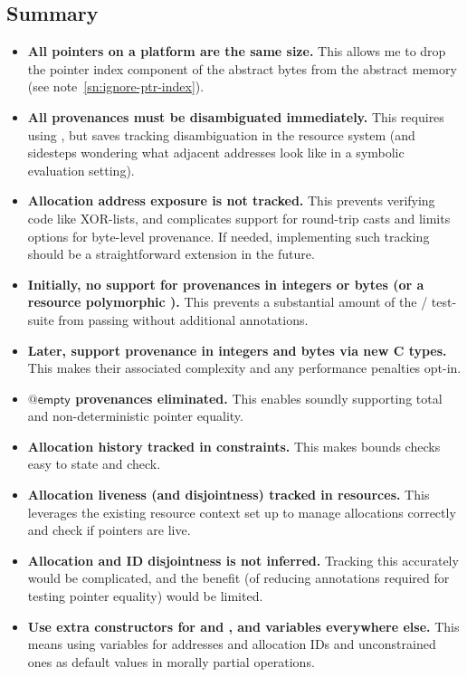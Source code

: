 \subsection{Summary}

\begin{itemize}
    \item \textbf{All pointers on a platform are the same size.} This
        allows me to drop the pointer index component of the abstract bytes
        from the abstract memory (see note~\ref{sn:ignore-ptr-index}).
    \item \textbf{All provenances must be disambiguated immediately.} This
        requires using , but saves tracking
        disambiguation in the resource system (and sidesteps wondering what
        adjacent addresses look like in a symbolic evaluation setting).
    \item \textbf{Allocation address exposure is not tracked.} This prevents
        verifying code like XOR-lists, and complicates support for round-trip
        casts and limits options for byte-level provenance. If needed,
        implementing such tracking should be a straightforward extension in the
        future.
    \item \textbf{Initially, no support for provenances in integers or bytes
        (or a resource polymorphic ).}
        This prevents a substantial amount of the /
        test-suite from passing without additional annotations.
    \item \textbf{Later, support provenance in integers and bytes via new C
        types.} This makes their associated complexity and any performance
        penalties opt-in.
    \item \textbf{$@\mathsf{empty}$ provenances eliminated.} This enables
        soundly supporting total and non-deterministic pointer equality.
    \item \textbf{Allocation history tracked in constraints.} This makes
        bounds checks easy to state and check.
    \item \textbf{Allocation liveness (and disjointness) tracked in
        resources.} This leverages the existing resource context set up
        to manage allocations correctly and check if pointers are live.
    \item \textbf{Allocation and ID disjointness is not inferred.} Tracking
        this accurately would be complicated, and the benefit (of reducing
        annotations required for testing pointer equality) would be limited.
    \item \textbf{Use extra constructors for  and
        , and variables everywhere else.} This means using
        variables for addresses and allocation IDs and unconstrained ones as
        default values in morally partial operations.
\end{itemize}

